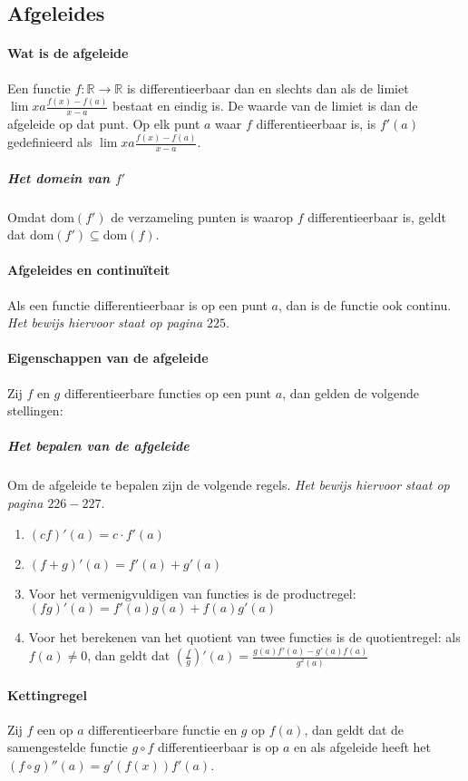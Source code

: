 \subsection{Afgeleides}

\paragraph{Wat is de afgeleide} Een functie $f:\mathbb{R}\to\mathbb{R}$ is differentieerbaar dan en slechts dan als de limiet $\lim{x}{a}\frac{f(x)-f(a)}{x-a}$ bestaat en eindig is. De waarde van de limiet is dan de afgeleide op dat punt. Op elk punt $a$ waar $f$ differentieerbaar is, is $f'(a)$ gedefinieerd als $\lim{x}{a}\frac{f(x)-f(a)}{x-a}$.

\subparagraph{Het domein van $f'$} Omdat $\text{dom}(f')$ de verzameling punten is waarop $f$ differentieerbaar is, geldt dat $\text{dom}(f')\subseteq\text{dom}(f)$.

\paragraph{Afgeleides en continuïteit} Als een functie differentieerbaar is op een punt $a$, dan is de functie ook continu. \textit{Het bewijs hiervoor staat op pagina $225$}.

\paragraph{Eigenschappen van de afgeleide} Zij $f$ en $g$ differentieerbare functies op een punt $a$, dan gelden de volgende stellingen:

\subparagraph{Het bepalen van de afgeleide} Om de afgeleide te bepalen zijn de volgende regels. \textit{Het bewijs hiervoor staat op pagina $226-227$}.


\begin{enumerate}
  \setlength\itemsep{0em}
  \item $(cf)'(a)=c\cdot f'(a)$
  \item $(f+g)'(a)=f'(a)+g'(a)$
  \item Voor het vermenigvuldigen van functies is de productregel: $(fg)'(a)=f'(a)g(a)+f(a)g'(a)$
  \item Voor het berekenen van het quotient van twee functies is de quotientregel: als $f(a)\neq0$, dan geldt dat $(\frac{f}{g})'(a)=\frac{g(a)f'(a)-g'(a)f(a)}{g^{2}(a)}$
\end{enumerate}

\paragraph{Kettingregel} Zij $f$ een op $a$ differentieerbare functie en $g$ op $f(a)$, dan geldt dat de samengestelde functie $g\circ f$ differentieerbaar is op $a$ en als afgeleide heeft het $(f\circ g)''(a) = g'(f(x))f'(a)$.
